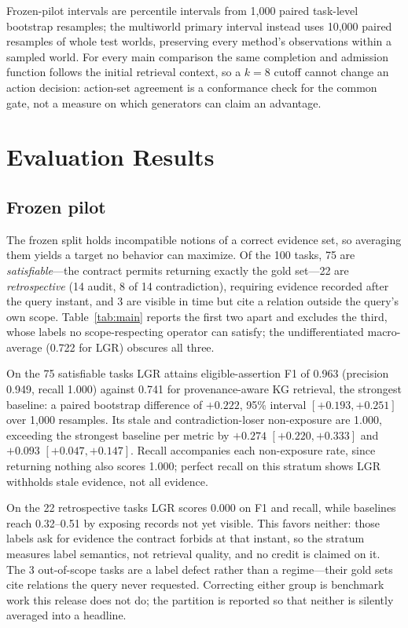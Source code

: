 \documentclass[conference]{IEEEtran}
\newcommand{\lgr}{\textsc{LGR}\xspace}
\begin{document}
Frozen-pilot intervals are percentile intervals from 1{,}000 paired task-level bootstrap resamples; the multiworld primary interval instead uses 10{,}000 paired resamples of whole test worlds, preserving every method's observations within a sampled world. For every main comparison the same completion and admission function follows the initial retrieval context, so a $k=8$ cutoff cannot change an action decision: action-set agreement is a conformance check for the common gate, not a measure on which generators can claim an advantage.

\section{Evaluation Results}
\label{sec:results}
\subsection{Frozen pilot}
The frozen split holds incompatible notions of a correct evidence set, so averaging them yields a target no behavior can maximize. Of the 100 tasks, 75 are \emph{satisfiable}---the contract permits returning exactly the gold set---22 are \emph{retrospective} (14 audit, 8 of 14 contradiction), requiring evidence recorded after the query instant, and 3 are visible in time but cite a relation outside the query's own scope. Table~\ref{tab:main} reports the first two apart and excludes the third, whose labels no scope-respecting operator can satisfy; the undifferentiated macro-average (0.722 for \lgr) obscures all three.

On the 75 satisfiable tasks \lgr attains eligible-assertion F1 of 0.963 (precision 0.949, recall 1.000) against 0.741 for provenance-aware KG retrieval, the strongest baseline: a paired bootstrap difference of $+0.222$, 95\% interval $[+0.193,+0.251]$ over 1{,}000 resamples. Its stale and contradiction-loser non-exposure are 1.000, exceeding the strongest baseline per metric by $+0.274$ $[+0.220,+0.333]$ and $+0.093$ $[+0.047,+0.147]$. Recall accompanies each non-exposure rate, since returning nothing also scores 1.000; perfect recall on this stratum shows \lgr withholds stale evidence, not all evidence.

On the 22 retrospective tasks \lgr scores 0.000 on F1 and recall, while baselines reach 0.32--0.51 by exposing records not yet visible. This favors neither: those labels ask for evidence the contract forbids at that instant, so the stratum measures label semantics, not retrieval quality, and no credit is claimed on it. The 3 out-of-scope tasks are a label defect rather than a regime---their gold sets cite relations the query never requested. Correcting either group is benchmark work this release does not do; the partition is reported so that neither is silently averaged into a headline.
\end{document}
